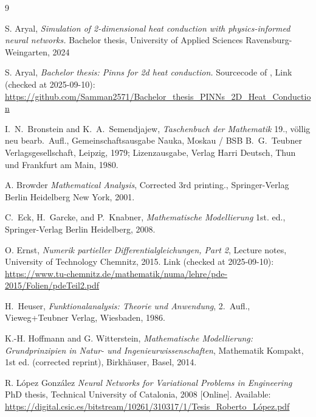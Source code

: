 \documentclass[a4paper,11pt]{article}
\theoremstyle{plain} %
\theoremstyle{definition} %
\theoremstyle{remark} %
\theoremstyle{remark}
\begin{document}
\newpage
\null
%
\newpage
\null
%
\newpage
\null
%
\newpage
\null
%
%
\newpage
\begin{thebibliography}{9}

S. Aryal, 
\emph{Simulation of 2-dimensional heat conduction with physics-informed neural networks.}
Bachelor thesis, University of Applied Sciences Ravensburg-Weingarten, 2024

S. Aryal, 
\emph{Bachelor thesis: Pinns for 2d heat conduction.}
Sourcecode of \cite{aryal2024a}, Link (checked at 2025-09-10): \url{https://github.com/Samman2571/Bachelor_thesis_PINNs_2D_Heat_Conduction}

I.~N.~Bronstein and K.~A.~Semendjajew,
\emph{Taschenbuch der Mathematik}
19., v\"ollig neu bearb.\ Aufl., Gemeinschaftsausgabe Nauka, Moskau /
BSB B.~G.~Teubner Verlagsgesellschaft, Leipzig, 1979;
Lizenzausgabe, Verlag Harri Deutsch, Thun und Frankfurt am Main, 1980.

A. Browder
\emph{Mathematical Analysis},
Corrected 3rd printing., Springer-Verlag Berlin Heidelberg New York, 2001.

C.~Eck, H.~Garcke, and P.~Knabner,
\emph{Mathematische Modellierung}
1st. ed., Springer-Verlag Berlin Heidelberg, 2008.

O. Ernst,
\emph{Numerik partieller Differentialgleichungen, Part 2}, 
Lecture notes, University of Technology Chemnitz, 2015.
Link (checked at 2025-09-10): \url{https://www.tu-chemnitz.de/mathematik/numa/lehre/pde-2015/Folien/pdeTeil2.pdf}

H.~Heuser,
\emph{Funktionalanalysis: Theorie und Anwendung},
2.\ Aufl., Vieweg+Teubner Verlag, Wiesbaden, 1986.

K.-H. Hoffmann and G. Witterstein, 
\emph{Mathematische Modellierung: Grundprinzipien in Natur- und Ingenieurwissenschaften}, 
Mathematik Kompakt, 1st ed. (corrected reprint), Birkhäuser, Basel, 2014.

R. López González
\emph{Neural Networks for Variational Problems in Engineering}
PhD thesis, Technical University of Catalonia, 2008
[Online]. Available: \url{https://digital.csic.es/bitstream/10261/310317/1/Tesis_Roberto_López.pdf}


\end{thebibliography}
\end{document}
